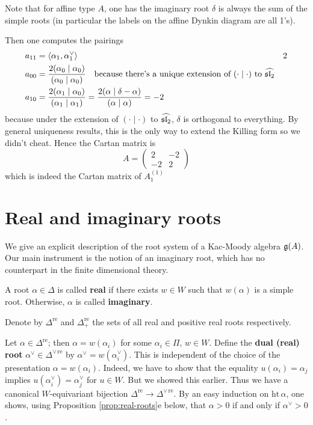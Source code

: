 \documentclass[12pt]{article}
\begin{document}
\begin{example}
    Note that for affine type $A$, one has the imaginary root $\delta$ is always the sum of the simple roots (in particular the labels on the affine Dynkin diagram are all 1's).

    Then one computes the pairings \begin{align*}
        a_{11} & = \langle \alpha_1, \alpha_1^\vee \rangle                                                                                                            & 2 \\
        a_{00} & = \frac{2(\alpha_0 \mid \alpha_0)}{(\alpha_0 \mid \alpha_0)} \texty{because there's a unique extension of $(\cdot \mid \cdot)$ to $\widehat{\sl_2}$}     \\
        a_{10} & = \frac{2(\alpha_1 \mid \alpha_0)}{(\alpha_1 \mid \alpha_1)} = \frac{2(\alpha \mid \delta - \alpha)}{(\alpha \mid \alpha)} = -2                          \\
    \end{align*} because under the extension of $(\cdot \mid \cdot)$ to $\widehat{\sl_2}$, $\delta$ is orthogonal to everything. By general uniqueness results, this is the only way to extend the Killing form so we didn't cheat. Hence the Cartan matrix is \[
        A = \begin{pmatrix}
            2  & -2 \\
            -2 & 2
        \end{pmatrix}
    \] which is indeed the Cartan matrix of $A_1^{(1)}$
\end{example}

\section{Real and imaginary roots}
We give an explicit description of the root system of a Kac-Moody algebra $\mf g(A)$. Our main instrument is the notion of an imaginary root, which has no counterpart in the finite dimensional theory.

\begin{definition}
    A root $\alpha \in \Delta$ is called \textbf{real} if there exists $w \in W$ such that $w(\alpha)$ is a simple root. Otherwise, $\alpha$ is called \textbf{imaginary}.
\end{definition}
Denote by $\Delta^{\mathrm{re}}$ and $\Delta^{\mathrm{re}}_+$ the sets of all real and positive real roots respectively.

Let $\alpha \in \Delta^{\mathrm{re}}$; then $\alpha = w(\alpha_i)$ for some $\alpha_i \in \Pi$, $w \in W$. Define the \textbf{dual (real) root} $\alpha^\vee \in \Delta^{\vee\,\mathrm{re}}$ by $\alpha^\vee = w(\alpha_i^\vee)$. This is independent of the choice of the presentation $\alpha = w(\alpha_i)$. Indeed, we have to show that the equality $u(\alpha_i) = \alpha_j$ implies $u(\alpha_i^\vee) = \alpha_j^\vee$ for $u \in W$. But we showed this earlier. Thus we have a canonical $W$-equivariant bijection $\Delta^{\mathrm{re}} \to \Delta^{\vee\,\mathrm{re}}$. By an easy induction on $\mathrm{ht}\,\alpha$, one shows, using Proposition \ref{prop:real-roots}e below, that $\alpha > 0$ if and only if $\alpha^\vee > 0$.
\end{document}
